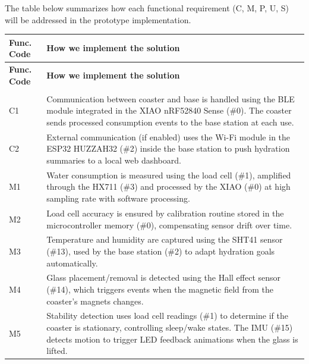 \documentclass{article}
\begin{document}
The table below summarizes how each functional requirement (C, M, P, U, S) will be addressed in the prototype implementation.

\begin{longtable}{|>{\centering\arraybackslash}m{1cm}|>{\arraybackslash}m{14.5cm}|}
\hline
\rowcolor{blue!25}
\textbf{Func. Code} & \textbf{How we implement the solution} \\
\hline
\endfirsthead

\hline
\rowcolor{blue!25}
\textbf{Func. Code} & \textbf{How we implement the solution} \\
\hline
\endhead

\hline
\multicolumn{2}{r}{\small \textit{Continued on next page}} \\
\endfoot

\hline
\endlastfoot

C1 & Communication between coaster and base is handled using the BLE module integrated in the XIAO nRF52840 Sense (\#0). The coaster sends processed consumption events to the base station at each use. \\
\hline

C2 & External communication (if enabled) uses the Wi-Fi module in the ESP32 HUZZAH32 (\#2) inside the base station to push hydration summaries to a local web dashboard. \\
\hline

M1 & Water consumption is measured using the load cell (\#1), amplified through the HX711 (\#3) and processed by the XIAO (\#0) at high sampling rate with software processing. \\
\hline

M2 & Load cell accuracy is ensured by calibration routine stored in the microcontroller memory (\#0), compensating sensor drift over time. \\
\hline

M3 & Temperature and humidity are captured using the SHT41 sensor (\#13), used by the base station (\#2) to adapt hydration goals automatically. \\
\hline

M4 & Glass placement/removal is detected using the Hall effect sensor (\#14), which triggers events when the magnetic field from the coaster’s magnets changes. \\
\hline

M5 & Stability detection uses load cell readings (\#1) to determine if the coaster is stationary, controlling sleep/wake states. The IMU (\#15) detects motion to trigger LED feedback animations when the glass is lifted. \\
\hline


\end{longtable}
\end{document}
